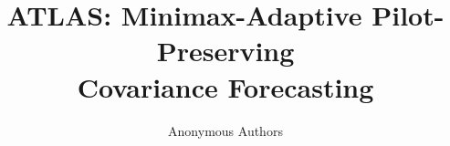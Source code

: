 \documentclass{article}
\title{\textbf{ATLAS: Minimax-Adaptive Pilot-Preserving\\Covariance Forecasting}}
\author{Anonymous Authors}
\theoremstyle{definition}
\theoremstyle{remark}
\begin{document}
\let\atlasoldtabular\tabular
\let\endatlasoldtabular\endtabular
\renewenvironment{tabular}[1]
  {\begin{adjustbox}{max width=\linewidth}\atlasoldtabular{#1}}
  {\endatlasoldtabular\end{adjustbox}}

\newif\ifatlasinserted
\atlasinsertedfalse
\let\atlasoriginalsection\section
\renewcommand{\section}[1]{%
  \def\atlasargument{#1}%
  \def\atlastarget{Relation to prior work}%
  \ifx\atlasargument\atlastarget
    \ifatlasinserted\else
      \global\atlasinsertedtrue
    \fi
  \fi
  \atlasoriginalsection{#1}%
}


\end{document}
